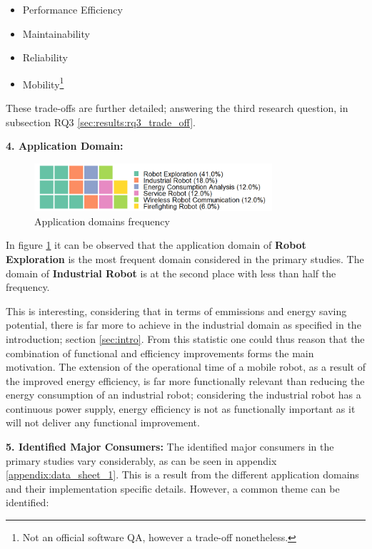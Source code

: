\begin{itemize}
    \item Performance Efficiency
    \item Maintainability
    \item Reliability
    \item Mobility\footnote{Not an official software QA\cite{iso2011quality_attributes}, however a trade-off nonetheless.}
\end{itemize}

These trade-offs are further detailed; answering the third research question, in subsection RQ3 \ref{sec:results:rq3_trade_off}.

\vspace{5mm}

\noindent\textbf{4. Application Domain:}
\begin{figure}[t]
    \includegraphics[width=250pt]{figures/waffle_appdomain_freq.png}
    \caption{Application domains frequency}
    \label{fig:app_domains}
\end{figure}
In figure \ref{fig:app_domains} it can be observed that the application domain of \textbf{Robot Exploration} is the most frequent
domain considered in the primary studies. 
The domain of \textbf{Industrial Robot} is at the second place with less than half the frequency.

This is interesting, considering that in terms of emmissions and energy saving potential, there is far more to achieve in the industrial domain
as specified in the introduction; section \ref{sec:intro}.
From this statistic one could thus reason that the combination of functional and efficiency improvements forms the main motivation. 
The extension of the operational time of a mobile robot, as a result of the improved energy efficiency, 
is far more functionally relevant than reducing the energy consumption of an industrial robot;
considering the industrial robot has a continuous power supply, energy efficiency is not as functionally important as it will
not deliver any functional improvement.

\vspace{5mm}

\noindent\textbf{5. Identified Major Consumers:}
The identified major consumers in the primary studies vary considerably, as can be seen in appendix \ref{appendix:data_sheet_1}.
This is a result from the different application domains and their implementation specific details.
However, a common theme can be identified:

